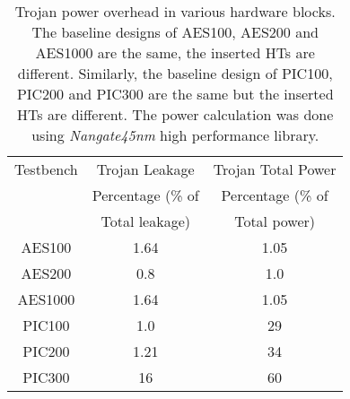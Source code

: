 \documentclass{beamer}
\begin{document}
\begin{columns}
                \begin{table}[!t]
                    \begin{center}
                    \begin{tabular*}{\columnwidth}{c c c}
                        Testbench & Trojan Leakage        & Trojan Total Power  \\
                                  & Percentage (\% of     & Percentage (\% of \\
                                  & Total leakage)        & Total power) \\
                    \hline
                        AES100    & 1.64           & 1.05 \\
                        AES200    & 0.8            & 1.0 \\
                        AES1000   & 1.64           & 1.05 \\
                        PIC100    &1.0             & 29 \\
                        PIC200    & 1.21           & 34\\
                        PIC300    &16              & 60 \\
                    \end{tabular*}
                    \vspace{-0.1in}%
                    \caption{Trojan power overhead in various hardware blocks. The
                    baseline designs of AES100, AES200 and AES1000 are the same, the inserted HTs
                    are different. Similarly, the baseline design of PIC100, PIC200 and PIC300
                    are the same but the inserted HTs are different. {\color{black}The power calculation was done using \textit{Nangate45nm} high performance library.}}
                    \vspace{-0.35in}
                    \label{tab:power}
                    \end{center}
                \end{table}


\end{columns}
\end{document}
